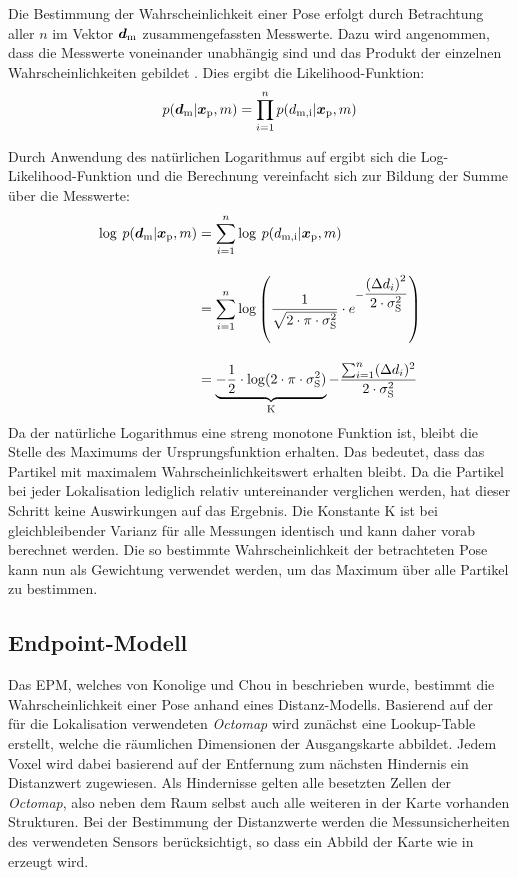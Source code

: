 Die Bestimmung der Wahrscheinlichkeit einer Pose erfolgt durch Betrachtung aller $n$ im Vektor $\mbox{\boldmath{$d$}}_{{\mathrm{m}}}$ zusammengefassten Messwerte. Dazu wird angenommen, dass die Messwerte voneinander unabhängig sind und das Produkt der einzelnen Wahrscheinlichkeiten gebildet \cite{Hornung2010}. Dies ergibt die Likelihood-Funktion:
%
\begin{equation}
\label{eq.likelihood}
p(\mbox{\boldmath{$d$}}_{{\mathrm{m}}}|\mbox{\boldmath{$x$}}_{{\mathrm{p}}},m) = \prod_{i=1}^{n}p(d_{{\mathrm{m,i}}}|\mbox{\boldmath{$x$}}_{{\mathrm{p}}},m)
\end{equation}

Durch Anwendung des natürlichen Logarithmus auf  ergibt sich die Log-Likelihood-Funktion und die Berechnung vereinfacht sich zur Bildung der Summe über die Messwerte:
%
\begin{equation}
\begin{split}
\log \: p(\mbox{\boldmath{$d$}}_{{\mathrm{m}}}|\mbox{\boldmath{$x$}}_{{\mathrm{p}}},m) & = \sum_{i=1}^{n}\log\: p(d_{{\mathrm{m,i}}}|\mbox{\boldmath{$x$}}_{{\mathrm{p}}},m) \\[1em]
& = \sum_{i=1}^{n}\log \left( \frac{1}{\sqrt{2 \cdot \pi \cdot \sigma_{{\mathrm{S}}}^2}} \cdot e^{-\dfrac{{({\Delta d}_i)}^2}{2 \cdot \sigma_{{\mathrm{S}}}^2}} \right)\\[1em]
& = \underbrace{-\frac{1}{2} \cdot \log(2 \cdot \pi \cdot\sigma_{{\mathrm{S}}}^2)}_{{\mathrm{K}}}-\dfrac{\sum_{i=1}^{n}({\Delta d}_i)^2}{2 \cdot \sigma_{{\mathrm{S}}}^2}
\end{split}
\end{equation}
Da der natürliche Logarithmus eine streng monotone Funktion ist, bleibt die Stelle des Maximums der Ursprungsfunktion erhalten. Das bedeutet, dass das Partikel mit maximalem Wahrscheinlichkeitswert erhalten bleibt. Da die Partikel bei jeder Lokalisation lediglich relativ untereinander verglichen werden, hat dieser Schritt keine Auswirkungen auf das Ergebnis. Die Konstante $\mathrm{K}$ ist bei gleichbleibender Varianz für alle Messungen identisch und kann daher vorab berechnet werden. Die so bestimmte Wahrscheinlichkeit der betrachteten Pose kann nun als Gewichtung verwendet werden, um das Maximum über alle Partikel zu bestimmen. 

\subsection{Endpoint-Modell}
Das EPM, welches von Konolige und Chou in \cite{Konolige1999} beschrieben wurde, bestimmt die Wahrscheinlichkeit einer Pose anhand eines Distanz-Modells. Basierend auf der für die Lokalisation verwendeten \textit{Octomap} wird zunächst eine Lookup-Table erstellt, welche die räumlichen Dimensionen der Ausgangskarte abbildet. Jedem Voxel wird dabei basierend auf der Entfernung zum nächsten Hindernis ein Distanzwert zugewiesen. Als Hindernisse gelten alle besetzten Zellen der \textit{Octomap}, also neben dem Raum selbst auch alle weiteren in der Karte vorhanden Strukturen. Bei der Bestimmung der Distanzwerte werden die Messunsicherheiten des verwendeten Sensors berücksichtigt, so dass ein Abbild der Karte wie in  erzeugt wird.\\

